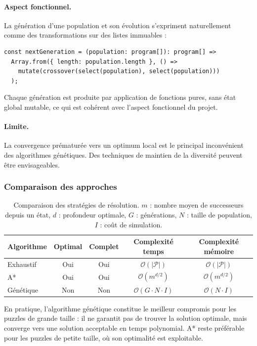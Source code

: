 \paragraph{Aspect fonctionnel.}
La génération d'une population et son évolution s'expriment naturellement
comme des transformations sur des listes immuables :

\begin{verbatim}
const nextGeneration = (population: program[]): program[] =>
  Array.from({ length: population.length }, () =>
    mutate(crossover(select(population), select(population)))
  );
\end{verbatim}

Chaque génération est produite par application de fonctions pures, sans état global mutable, ce qui est cohérent avec l'aspect fonctionnel du projet.

\paragraph{Limite.}
La convergence prématurée vers un optimum local est le principal inconvénient des algorithmes génétiques. Des techniques de maintien de la diversité peuvent être envisageables.

\subsubsection*{Comparaison des approches}

\begin{table}[h]
\centering
\begin{tabular}{|l|c|c|c|c|}
\hline
\textbf{Algorithme} & \textbf{Optimal} & \textbf{Complet} & \textbf{Complexité temps} & \textbf{Complexité mémoire} \\
\hline
Exhaustif & Oui & Oui & $\mathcal{O}(|\mathcal{P}|)$ & $\mathcal{O}(|\mathcal{P}|)$ \\
A* & Oui & Oui & $\mathcal{O}(m^{d/2})$ & $\mathcal{O}(m^{d/2})$ \\
Génétique & Non & Non & $\mathcal{O}(G \cdot N \cdot I)$ & $\mathcal{O}(N \cdot I)$ \\
\hline
\end{tabular}
\caption{Comparaison des stratégies de résolution. $m$ : nombre moyen de successeurs depuis un état, $d$ : profondeur optimale, $G$ : générations, $N$ : taille de population, $I$ : coût de simulation.}
\end{table}

En pratique, l'algorithme génétique constitue le meilleur compromis pour les puzzles de grande taille : il ne garantit pas de trouver la solution optimale, mais converge vers une solution acceptable en temps polynomial. A* reste préférable pour les puzzles de petite taille, où son optimalité est exploitable.

